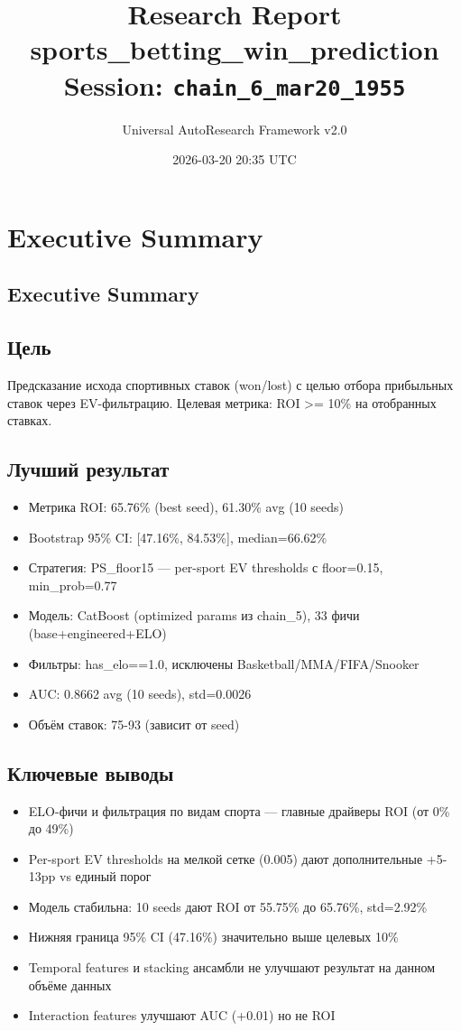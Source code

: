 \documentclass[12pt,a4paper]{article}
\title{
    \Large\textbf{Research Report}\\[0.5em]
    \large sports\_betting\_win\_prediction\\[0.3em]
    \normalsize Session: \texttt{chain\_6\_mar20\_1955}
}
\author{Universal AutoResearch Framework v2.0}
\date{2026-03-20 20:35 UTC}
\begin{document}
\maketitle
\tableofcontents
\newpage


\section{Executive Summary}

\subsection{Executive Summary}

\subsection{Цель}
Предсказание исхода спортивных ставок (won/lost) с целью отбора прибыльных ставок через EV-фильтрацию. Целевая метрика: ROI >= 10\% на отобранных ставках.

\subsection{Лучший результат}
\begin{itemize}
  \item Метрика ROI: 65.76\% (best seed), 61.30\% avg (10 seeds)
  \item Bootstrap 95\% CI: [47.16\%, 84.53\%], median=66.62\%
  \item Стратегия: PS\_floor15 — per-sport EV thresholds с floor=0.15, min\_prob=0.77
  \item Модель: CatBoost (optimized params из chain\_5), 33 фичи (base+engineered+ELO)
  \item Фильтры: has\_elo==1.0, исключены Basketball/MMA/FIFA/Snooker
  \item AUC: 0.8662 avg (10 seeds), std=0.0026
  \item Объём ставок: 75-93 (зависит от seed)
\end{itemize}

\subsection{Ключевые выводы}
\begin{itemize}
  \item ELO-фичи и фильтрация по видам спорта — главные драйверы ROI (от 0\% до 49\%)
  \item Per-sport EV thresholds на мелкой сетке (0.005) дают дополнительные +5-13pp vs единый порог
  \item Модель стабильна: 10 seeds дают ROI от 55.75\% до 65.76\%, std=2.92\%
  \item Нижняя граница 95\% CI (47.16\%) значительно выше целевых 10\%
  \item Temporal features и stacking ансамбли не улучшают результат на данном объёме данных
  \item Interaction features улучшают AUC (+0.01) но не ROI
\end{itemize}
\end{document}
